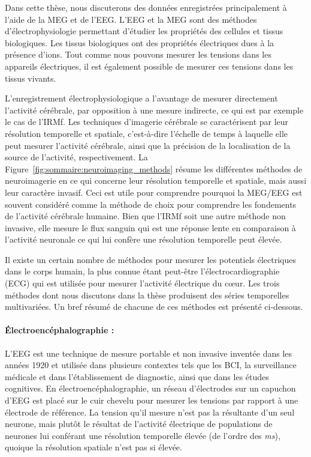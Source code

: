 Dans cette thèse, nous discuterons des données enregistrées principalement à l'aide de la MEG et de l’EEG. L'EEG et la MEG sont des méthodes d'électrophysiologie permettant d’étudier les propriétés des cellules et tissus biologiques. Les tissus biologiques ont des propriétés électriques dues à la présence d'ions. Tout comme nous pouvons mesurer les tensions dans les appareils électriques, il est également possible de mesurer ces tensions dans les tissus vivants.

L'enregistrement électrophysiologique a l'avantage de mesurer directement l'activité cérébrale, par opposition à une mesure indirecte, ce qui est par exemple le cas de l'IRMf. Les techniques d'imagerie cérébrale se caractérisent par leur résolution temporelle et spatiale, c'est-à-dire l'échelle de temps à laquelle elle peut mesurer l'activité cérébrale, ainsi que la précision de la localisation de la source de l'activité, respectivement. La Figure~\ref{fig:sommaire:neuroimaging_methods} résume les différentes méthodes de neuroimagerie en ce qui concerne leur résolution temporelle et spatiale, mais aussi leur caractère invasif. Ceci est utile pour comprendre pourquoi la MEG/EEG est souvent considéré comme la méthode de choix pour comprendre les fondements de l'activité cérébrale humaine. Bien que l'IRMf soit une autre méthode non invasive, elle mesure le flux sanguin qui est une réponse lente en comparaison à l'activité neuronale ce qui lui confère une résolution temporelle peut élevée.

Il existe un certain nombre de méthodes pour mesurer les potentiels électriques dans le corps humain, la plus connue étant peut-être l'électrocardiographie (ECG) qui est utilisée pour mesurer l'activité électrique du cœur. Les trois méthodes dont nous discutons dans la thèse produisent des séries temporelles multivariées. Un bref résumé de chacune de ces méthodes est présenté ci-dessous.

\paragraph{Électroencéphalographie :} L'EEG est une technique de mesure portable et non invasive inventée dans les années 1920 et utilisée dans plusieurs contextes tels que les BCI, la surveillance médicale et dans l’établissement de diagnostic, ainsi que dans les études cognitives. En électroencéphalographie, un réseau d'électrodes sur un capuchon d’EEG est placé sur le cuir chevelu pour mesurer les tensions par rapport à une électrode de référence. La tension qu'il mesure n'est pas  la résultante d'un seul neurone, mais plutôt le résultat de l'activité électrique de populations de neurones lui conférant une résolution temporelle élevée (de l'ordre des \emph{ms}), quoique la résolution spatiale n'est pas si élevée.

